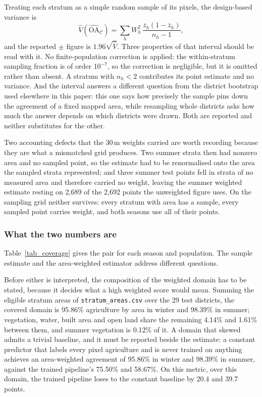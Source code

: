 \documentclass[conference]{IEEEtran}
\begin{document}
Treating each stratum as a simple random sample of its pixels, the design-based variance is
\begin{equation}
\widehat{V}\!\left(\widehat{\mathrm{OA}}_{\mathcal{C}}\right)
 = \sum_h W_h^2 \, \frac{\bar{z}_h\left(1-\bar{z}_h\right)}{n_h - 1},
\label{eq:var}
\end{equation}
and the reported $\pm$ figure is $1.96\sqrt{\widehat{V}}$. Three properties of that interval should be read with it. No finite-population correction is applied: the within-stratum sampling fraction is of order $10^{-7}$, so the correction is negligible, but it is omitted rather than absent. A stratum with $n_h < 2$ contributes its point estimate and no variance. And the interval answers a different question from the district bootstrap used elsewhere in this paper: this one says how precisely the sample pins down the agreement of a fixed mapped area, while resampling whole districts asks how much the answer depends on which districts were drawn. Both are reported and neither substitutes for the other.

Two accounting defects that the 30\,m weights carried are worth recording because they are what a mismatched grid produces. Two summer strata then had nonzero area and no sampled point, so the estimate had to be renormalised onto the area the sampled strata represented; and three summer test points fell in strata of no measured area and therefore carried no weight, leaving the summer weighted estimate resting on 2,689 of the 2,692 points the unweighted figure uses. On the sampling grid neither survives: every stratum with area has a sample, every sampled point carries weight, and both seasons use all of their points.

\subsubsection{What the two numbers are}
Table~\ref{tab_coverage} gives the pair for each season and population. The sample estimate and the area-weighted estimator address different questions.

Before either is interpreted, the composition of the weighted domain has to be stated, because it decides what a high weighted score would mean. Summing the eligible stratum areas of \texttt{stratum\_areas.csv} over the 29 test districts, the covered domain is 95.86\% agriculture by area in winter and 98.39\% in summer; vegetation, water, built area and open land share the remaining 4.14\% and 1.61\% between them, and summer vegetation is 0.12\% of it. A domain that skewed admits a trivial baseline, and it must be reported beside the estimate: a constant predictor that labels every pixel agriculture and is never trained on anything achieves an area-weighted agreement of 95.86\% in winter and 98.39\% in summer, against the trained pipeline's 75.50\% and 58.67\%. On this metric, over this domain, the trained pipeline loses to the constant baseline by 20.4 and 39.7 points.
\end{document}
